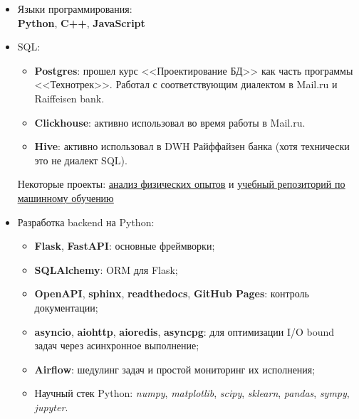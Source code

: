 \begin{itemize}
	\item Языки программирования: \\
        \textbf{Python}, \textbf{C++}, \textbf{JavaScript}
    \item SQL:
        \begin{itemize}
            \item \textbf{Postgres}: прошел курс <<Проектирование БД>> как часть программы <<Технотрек>>. Работал с соответствующим диалектом в Mail.ru и Raiffeisen bank.
            \item \textbf{Clickhouse}: активно использовал во время работы в Mail.ru.
            \item \textbf{Hive}: активно использовал в DWH Райффайзен банка (хотя технически это не диалект SQL). 
        \end{itemize}
    Некоторые проекты: \href{https://github.com/alekseik1/phys\_labs}{\underline{анализ физических опытов}} и \href{https://github.com/alekseik1/machine\_learning\_coursera}{\underline{учебный репозиторий по машинному обучению}}
    \item Разработка backend на Python:
        \begin{itemize}
            \item \textbf{Flask}, \textbf{FastAPI}: основные фреймворки;
            \item \textbf{SQLAlchemy}: ORM для Flask;
            \item \textbf{OpenAPI}, \textbf{sphinx}, \textbf{readthedocs}, \textbf{GitHub Pages}: контроль документации;
            \item \textbf{asyncio}, \textbf{aiohttp}, \textbf{aioredis}, \textbf{asyncpg}: для оптимизации I/O bound задач через асинхронное выполнение;
            \item \textbf{Airflow}: шедулинг задач и простой мониторинг их исполнения;
            \item Научный стек Python: \textit{numpy}, \textit{matplotlib}, \textit{scipy}, \textit{sklearn}, \textit{pandas}, \textit{sympy}, \textit{jupyter}.

\end{itemize}
\end{itemize}
